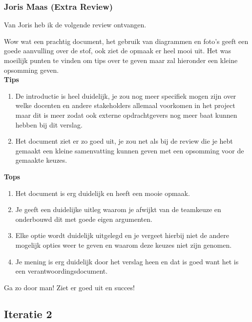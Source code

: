 \documentclass[a4paper]{report}
\begin{document}
\subsubsection{Joris Maas (Extra Review)}
Van Joris heb ik de volgende review ontvangen.
\par\smallskip 
Wow wat een prachtig document, het gebruik van diagrammen en foto’s geeft een goede aanvulling over de stof, ook ziet de opmaak er heel mooi uit. Het was moeilijk punten te vinden om tips over te geven maar zal hieronder een kleine opsomming geven. \\
\textbf{Tips}
\begin{enumerate}
  \item De introductie is heel duidelijk, je zou nog meer specifiek mogen zijn over welke docenten en andere stakeholders allemaal voorkomen in het project maar dit is meer zodat ook externe opdrachtgevers nog meer baat kunnen hebben bij dit verslag.
  \item Het document ziet er zo goed uit, je zou net als bij de review die je hebt gemaakt een kleine samenvatting kunnen geven met een opsomming voor de gemaakte keuzes.
\end{enumerate}
\textbf{Tops}
\begin{enumerate}
  \item Het document is erg duidelijk en heeft een mooie opmaak.
  \item Je geeft een duidelijke uitleg waarom je afwijkt van de teamkeuze en onderbouwd dit met goede eigen argumenten.
  \item Elke optie wordt duidelijk uitgelegd en je vergeet hierbij niet de andere mogelijk opties weer te geven en waarom deze keuzes niet zijn genomen.
  \item Je mening is erg duidelijk door het verslag heen en dat is goed want het is een verantwoordingsdocument.
\end{enumerate}

Ga zo door man! Ziet er goed uit en succes!

\subsection{Iteratie 2}
\end{document}
